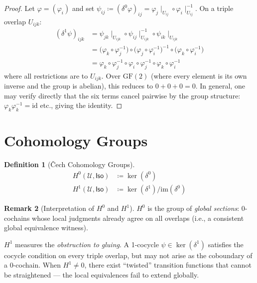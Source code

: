\documentclass[11pt,a4paper]{report}
\theoremstyle{definition}
\newtheorem{definition}{Definition}[chapter]
\newtheorem{remark}[definition]{Remark}
\theoremstyle{plain}
\newcommand{\covers}{\mathcal{U}}
\newcommand{\Iso}{\mathsf{Iso}}
\newcommand{\Hzero}{H^0}
\newcommand{\Hone}{H^1}
\newcommand{\restr}[2]{#1\!\!\mid_{#2}}
\begin{document}
\begin{proof}
Let $\varphi = (\varphi_i)$ and set $\psi_{ij} \coloneqq (\delta^0\varphi)_{ij}
= \restr{\varphi_j}{U_{ij}} \circ \restr{\varphi_i}{U_{ij}}^{-1}$.
On a triple overlap $U_{ijk}$:
\begin{align*}
  (\delta^1\psi)_{ijk}
  &= \restr{\psi_{jk}}{U_{ijk}} \circ \restr{\psi_{ij}}{U_{ijk}}^{-1}
     \circ \restr{\psi_{ik}}{U_{ijk}} \\
  &= \bigl(\varphi_k \circ \varphi_j^{-1}\bigr) \circ
     \bigl(\varphi_j \circ \varphi_i^{-1}\bigr)^{-1} \circ
     \bigl(\varphi_k \circ \varphi_i^{-1}\bigr) \\
  &= \varphi_k \circ \varphi_j^{-1} \circ \varphi_i \circ \varphi_j^{-1}
     \circ \varphi_k \circ \varphi_i^{-1}
\end{align*}
where all restrictions are to $U_{ijk}$.  Over $\mathrm{GF}(2)$ (where
every element is its own inverse and the group is abelian), this reduces
to $0 + 0 + 0 = 0$.  In general, one may verify directly that the
six terms cancel pairwise by the group structure: $\varphi_k \varphi_k^{-1} =
\mathrm{id}$ etc., giving the identity.
\end{proof}

\section{Cohomology Groups}

\begin{definition}[\v{C}ech Cohomology Groups]
\label{def:cech-cohomology}
\begin{align}
  \Hzero(\covers, \Iso) &\coloneqq \ker(\delta^0) \\
  \Hone(\covers, \Iso) &\coloneqq \ker(\delta^1) / \mathrm{im}(\delta^0)
\end{align}
\end{definition}

\begin{remark}[Interpretation of $\Hzero$ and $\Hone$]
\label{rem:h0h1-meaning}
$\Hzero$ is the group of \emph{global sections}: 0-cochains whose local
judgments already agree on all overlaps (i.e., a consistent global
equivalence witness).

$\Hone$ measures the \emph{obstruction to gluing}.  A 1-cocycle
$\psi \in \ker(\delta^1)$ satisfies the cocycle condition on every
triple overlap, but may not arise as the coboundary of a 0-cochain.
When $\Hone \neq 0$, there exist ``twisted'' transition functions
that cannot be straightened --- the local equivalences fail to extend
globally.
\end{remark}
\end{document}
